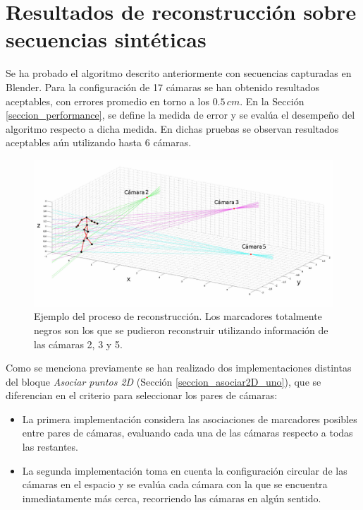\section{Resultados de reconstrucción sobre secuencias sintéticas}

Se ha probado el algoritmo descrito anteriormente con secuencias capturadas en Blender. Para la configuración de 17 cámaras se han obtenido resultados aceptables,  con errores promedio en torno a los $0.5\,cm$. En la Sección \ref{seccion_performance}, se define la medida de error  y se evalúa el desempeño del algoritmo respecto a dicha medida. En dichas pruebas se observan resultados aceptables aún utilizando hasta 6 cámaras.

\begin{figure}[ht!]
\centering
\captionsetup{justification=centering,margin=0.2cm}
\includegraphics[scale=0.5]{img/Reconstruccion/Reconstruccion_3_camaras2.jpg}
\caption{Ejemplo del proceso de reconstrucción. Los marcadores totalmente negros son los que se pudieron reconstruir utilizando información de las cámaras 2, 3 y 5.}
\end{figure}


Como se menciona previamente se han realizado dos implementaciones distintas del bloque  \emph{Asociar puntos 2D} (Sección \ref{seccion_asociar2D_uno}), que se diferencian en el criterio para seleccionar los pares de cámaras:
\begin{itemize}
\item La primera implementación  considera las asociaciones de marcadores posibles entre pares de cámaras, evaluando cada una de las cámaras respecto a todas las restantes. 
\item La segunda implementación toma en cuenta  la configuración circular de las cámaras en el espacio y se evalúa cada cámara con la que se encuentra inmediatamente más cerca,  recorriendo las cámaras en algún sentido.
\end{itemize}
  

